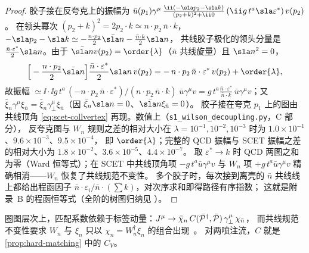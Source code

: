 \begin{proof}
胶子接在反夸克上的振幅为
$\bar u(p_1)\gamma^\mu\,\frac{\ii(-\sla p_2-\sla k)}{(p_2+k)^2+\ii0}\,(\ii g\,t^a\sla\varepsilon^*)\,v(p_2)$。
在领头幂次 $(p_2+k)^2=2p_2\cdot k\simeq n\cdot p_2\,\bar n\cdot k$，$-\sla p_2-\sla k\simeq-\frac{n\cdot p_2}{2}\nbslash-\frac{\bar n\cdot k}{2}\nslash$，
共线胶子极化的领头分量是 $\frac{\bar n\cdot\varepsilon^*}{2}\nslash$。由于 $\nbslash v(p_2)=\order{\lambda}$（$\bar n$ 共线旋量）且 $\nslash^2=0$，
\[
\Big[-\frac{n\cdot p_2}{2}\nbslash\Big]\frac{\bar n\cdot\varepsilon^*}{2}\nslash\,v(p_2)=-\,n\cdot p_2\,\bar n\cdot\varepsilon^*\,v(p_2)+\order{\lambda},
\]
故振幅 $\simeq\ii\cdot\ii g\,t^a\,(-n\cdot p_2\,\bar n\cdot\varepsilon^*)/(n\cdot p_2\,\bar n\cdot k)\;\bar u\gamma^\mu v
=g\,t^a\frac{\bar n\cdot\varepsilon^*}{\bar n\cdot k}\,\bar u\gamma^\mu v$；又
$\bar\xi_n\gamma^\mu\xi_{\bar n}=\bar\xi_n\gamma_\perp^\mu\xi_{\bar n}$（因 $\bar\xi_n\nslash=0$、$\nbslash\xi_{\bar n}=0$）。
胶子接在夸克 $p_1$ 上的图由共线顶角 \cref{eq:scet-collvertex} 再现。数值上（\texttt{s1\_\allowbreak wilson\_\allowbreak decoupling.py}，C 部分），
反夸克图与 $W_n$ 规则之差的相对大小在 $\lambda=10^{-1},10^{-2},10^{-3}$ 时为 $1.0\times10^{-1}$、$9.6\times10^{-3}$、$9.5\times10^{-4}$，
即 $\order{\lambda}$；完整的 QCD 振幅与 SCET 振幅之差的相对大小为 $1.8\times10^{-2}$、$3.6\times10^{-5}$、$4.4\times10^{-7}$。
取 $\varepsilon^*\to k$ 时 QCD 两图之和为零（Ward 恒等式）；在 SCET 中共线顶角项 $-g\,t^a\bar u\gamma^\mu v$ 与 $W_n$ 项
$+g\,t^a\bar u\gamma^\mu v$ 精确相消——$W_n$ 恢复了共线规范不变性。
多个胶子时，每次接到离壳的 $\bar n$ 共线线上都给出程函因子 $\bar n\cdot\varepsilon_i/\bar n\cdot(\sum k)$，对次序求和即得路径有序指数；
这就是附录~B 的程函恒等式（全阶的树图归纳见 \cite{BauerEtAl2001,BauerStewart2001}）。
\end{proof}

圈图层次上，匹配系数依赖于标签动量：$J^\mu\to\bar\chi_n\,C(\bar{\mathcal P}^\dagger,\bar{\mathcal P})\,\gamma_\perp^\mu\,\chi_{\bar n}$，
而共线规范不变性要求 $W_n$ 与 $\xi_n$ 只以 $\chi_n=W_n^\dagger\xi_n$ 的组合出现~\cite{BauerStewart2001}。
对两喷注流，$C$ 就是 \cref{prop:hard-matching} 中的 $C_V$。

